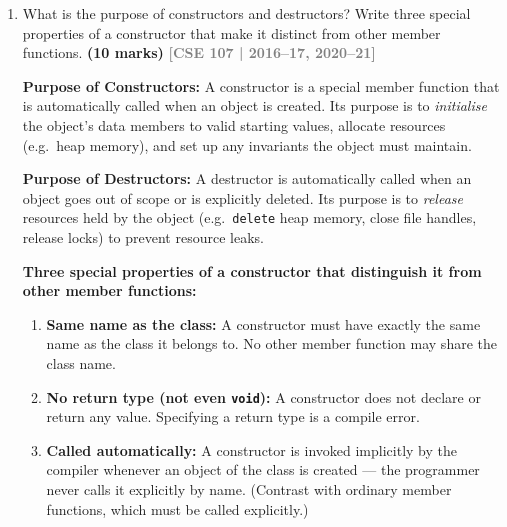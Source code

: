 \documentclass[12pt,a3paper]{article}
\newcommand{\yr}[1]{\hfill\textcolor{gray}{\small\textbf{[#1]}}}
\newcommand{\mk}[1]{\textcolor{orange!70!black}{\small\textbf{(#1 marks)}}}
\begin{document}
\begin{enumerate}
\begin{tcolorbox}[enhanced,breakable,ansbox,colback=cA!4,colframe=cA,
  boxrule=0.8pt,arc=5pt,
  title={\textbf{Answer}},fonttitle=\bfseries\color{white},colbacktitle=cA]
\end{tcolorbox}

\item What is the purpose of constructors and destructors? Write three special properties of a constructor that make it distinct from other member functions. \mk{10}
\yr{CSE 107 | 2016--17, 2020--21}

\begin{tcolorbox}[enhanced,breakable,ansbox,colback=cA!4,colframe=cA,
  boxrule=0.8pt,arc=5pt,
  title={\textbf{Answer}},fonttitle=\bfseries\color{white},colbacktitle=cA]

\textbf{Purpose of Constructors:}
A constructor is a special member function that is automatically
called when an object is created.  Its purpose is to
\emph{initialise} the object's data members to valid starting
values, allocate resources (e.g.\ heap memory), and set up any
invariants the object must maintain.

\textbf{Purpose of Destructors:}
A destructor is automatically called when an object goes out of scope
or is explicitly deleted.  Its purpose is to \emph{release} resources
held by the object (e.g.\ \texttt{delete} heap memory, close file
handles, release locks) to prevent resource leaks.

\medskip
\textbf{Three special properties of a constructor that distinguish it
from other member functions:}

\begin{enumerate}[label=\textbf{\arabic*.}]
  \item \textbf{Same name as the class:} A constructor must have
    exactly the same name as the class it belongs to.  No other
    member function may share the class name.

  \item \textbf{No return type (not even \texttt{void}):} A
    constructor does not declare or return any value.  Specifying a
    return type is a compile error.

  \item \textbf{Called automatically:} A constructor is invoked
    implicitly by the compiler whenever an object of the class is
    created --- the programmer never calls it explicitly by name.
    (Contrast with ordinary member functions, which must be called
    explicitly.)
\end{enumerate}

\end{tcolorbox}


\end{enumerate}
\end{document}
